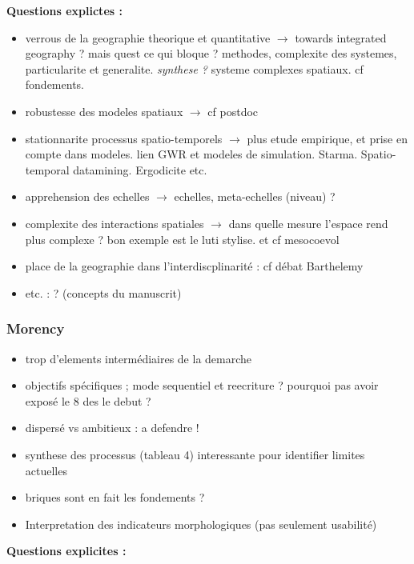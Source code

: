 \documentclass[11pt]{article}
\begin{document}
\textbf{Questions explictes :}

\begin{itemize}
	\item verrous de la geographie theorique et quantitative $\rightarrow$ towards integrated geography ? mais quest ce qui bloque ? methodes, complexite des systemes, particularite et generalite. \textit{synthese ?} systeme complexes spatiaux. cf fondements.
	\item robustesse des modeles spatiaux $\rightarrow$ cf postdoc
	\item stationnarite processus spatio-temporels $\rightarrow$ plus etude empirique, et prise en compte dans modeles. lien GWR et modeles de simulation. Starma. Spatio-temporal datamining. Ergodicite etc.
	\item apprehension des echelles $\rightarrow$ echelles, meta-echelles (niveau) ?
	\item complexite des interactions spatiales $\rightarrow$ dans quelle mesure l'espace rend plus complexe ? bon exemple est le luti stylise. et cf mesocoevol
	\item place de la geographie dans l'interdiscplinarité : cf débat Barthelemy
	\item etc. : ? (concepts du manuscrit)
\end{itemize}


\subsubsection*{Morency}


\begin{itemize}
	\item trop d'elements intermédiaires de la demarche
	\item objectifs spécifiques ; mode sequentiel et reecriture ? pourquoi pas avoir exposé le 8 des le debut ?
	\item dispersé vs ambitieux : a defendre !
	\item synthese des processus (tableau 4) interessante pour identifier limites actuelles
	\item briques sont en fait les fondements ?
	\item Interpretation des indicateurs morphologiques (pas seulement usabilité)
\end{itemize}


\textbf{Questions explicites : }
\end{document}
